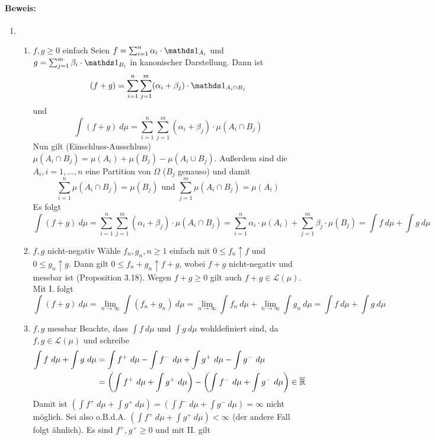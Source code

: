 \documentclass[12pt]{report}
\begin{document}
 \paragraph{Beweis:}
 \begin{enumerate}[label=(\roman*)]
     \item
     \begin{enumerate}[label=\Roman*.]
        \item $f,g\geq 0$ einfach\newline
        Seien $f=\sum_{i=1}^n\alpha_i\cdot\ind{A_i}$ und $g=\sum_{j=1}^m\beta_i\cdot\ind{B_i}$ in kanonischer Darstellung. Dann ist
        $$(f+g)=\sum_{i=1}^n\sum_{j=1}^m(\alpha_i+\beta_j)\cdot\ind{A_i\cap B_j}$$
        und 
        $$\int (f+g)\ d\mu=\sum_{i=1}^n\sum_{j=1}^m(\alpha_i+\beta_j)\cdot\mu(A_i\cap B_j)$$
        Nun gilt (Einschluss-Ausschluss) $\mu(A_i\cap B_j)=\mu(A_i)+\mu(B_j)-\mu(A_i\cup B_j)$. Au\ss{}erdem sind die $A_i,i=1,\hdots,n$ eine Partition von $\Omega$ ($B_j$ genauso) und damit  
        $$\sum_{i=1}^n\mu(A_i\cap B_j)=\mu(B_j)\text{ und } \sum_{j=1}^m\mu(A_i\cap B_j)=\mu(A_i)$$
        Es folgt 
        $$\int(f+g)\ d\mu=\sum_{i=1}^n\sum_{j=1}^m(\alpha_i+\beta_j)\cdot\mu(A_i\cap B_j)=\sum_{i=1}^n\alpha_i\cdot\mu(A_i)+\sum_{j=1}^m\beta_j\cdot\mu(B_j)=\int f\ d \mu+\int g\ d\mu$$
        \item $f,g$ nicht-negativ\newline
        W\"ahle $f_n,g_n,n\geq1$ einfach mit $0\leq f_n\uparrow f$ und $0\leq g_n\uparrow g$. Dann gilt $0\leq f_n+g_n\uparrow f+g$, wobei $f+g$ nicht-negativ und messbar ist (Proposition 3.18). Wegen $f+g\geq0$ gilt auch $f+g\in\mathcal{L}(\mu)$. Mit I. folgt
        $$\int (f+g)\ d\mu=\lim_{n\to\infty}\int (f_n+g_n)\ d\mu=\lim_{n\to\infty}\int f_n\ d\mu+\lim_{n\to\infty}\int g_n\ d\mu=\int f\ d\mu+\int g\ d\mu$$
        \item $f,g$ messbar\newline
        Beachte, dass $\displaystyle\int f\ d\mu$ und $\displaystyle\int g\ d\mu$ wohldefiniert sind, da $f,g\in\mathcal{L}(\mu)$ und schreibe
        \begin{align*}
           \int f\ d\mu+\int g\ d\mu&=\int f^+\ d\mu-\int f^-\ d\mu+\int g^+\ d\mu -\int g^-\ d\mu\\
           &=\left(\int f^+\ d\mu+\int g^+\ d\mu\right)-\left(\int f^-\ d\mu+\int g^-\ d\mu\right)\in\overline\R
        \end{align*}
        Damit ist $\displaystyle\left(\int f^+\ d\mu+\int g^+\ d\mu\right)=\left(\int f^-\ d\mu+\int g^-\ d\mu\right)=\infty$ nicht m\"oglich. Sei also o.B.d.A. $\displaystyle\left(\int f^+\ d\mu+\int g^+\ d\mu\right)<\infty$ (der andere Fall folgt \"ahnlich). Es sind $f^+,g^+\geq0$ und mit II. gilt 

\end{enumerate}
\end{enumerate}
\end{document}
